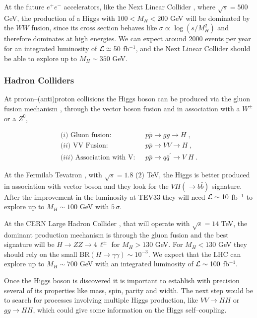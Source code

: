 \documentclass[12pt]{report}
\newcommand{\ba}{\begin{array}}
\newcommand{\ea}{\end{array}}
\begin{document}
At the future $e^+e^-$ accelerators,  like the Next Linear Collider
\cite{Nlc:Review}, where $\sqrt{s} = 500$ GeV, the production of a
Higgs with  $100 < M_H < 200$ GeV will be  dominated by the $WW$
fusion, since its cross section behaves like $\sigma \propto
\log(s/M_H^2)$ and therefore dominates at high energies. We can
expect around $2000$ events per year for an integrated luminosity of
${\cal L} \simeq 50$ fb$^{-1}$, and the Next Linear Collider should
be able to  explore up to $M_H \sim 350$ GeV.


\subsubsection{Hadron Colliders} \indent

At proton--(anti)proton collisions the Higgs boson can be produced via
the gluon fusion mechanism \cite{Georgi:78,Novaes:83}, through the vector
boson fusion and in association with a $W^\pm$ or a $Z^0$,

\[
\ba{ll}
\mbox{($i$) Gluon fusion:}		& 
~~~ p \bar{p} \to gg \to H \; , \\[0.2cm]
\mbox{($ii$) VV Fusion:}			& 
~~~ p \bar{p} \to VV \to H \; , \\[0.2cm]
\mbox{($iii$) Association with V:}		& 
~~~ p \bar{p} \to q\bar{q}^\prime \to V \; H \; .
\ea 
\]

At the Fermilab Tevatron \cite{Stange:94}, with $\sqrt{s} = 1.8$
($2$) TeV, the Higgs is better produced in association with vector
boson and they  look for the $V H (\to b \bar{b})$ signature. After the
improvement in the luminosity at TEV33 they will need ${\cal L} \sim 10$
fb$^{-1}$ to explore up to $M_H \sim 100$ GeV with $5 \, \sigma$.

At the CERN Large Hadron Collider \cite{Spira:95}, that will operate
with $\sqrt{s} = 14$ TeV, the dominant production mechanism is
through the gluon fusion  and the best signature will be $H \to ZZ
\to 4 \, \ell^\pm$ for $M_H > 130$ GeV. For  $M_H < 130$ GeV they
should rely on the small BR$(H \to \gamma\gamma) \sim 10^{-3}$. We
expect that the LHC can explore up to $M_H \sim 700$ GeV with an
integrated luminosity of ${\cal L} \sim 100$ fb$^{-1}$.

Once the Higgs boson is discovered it is important to establish with
precision several of its properties like mass, spin, parity and width.
The next step would be to search for processes involving multiple Higgs
production, like $VV \to HH$ or $gg \to HH$, which could give some
information on the Higgs self--coupling. 
\end{document}
